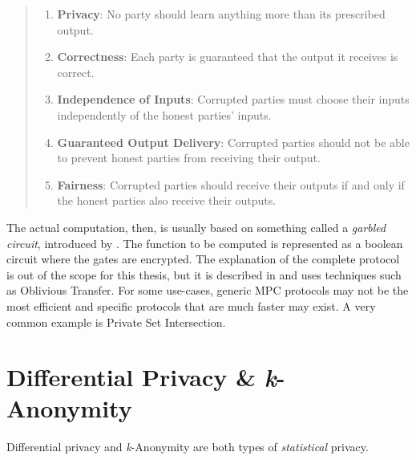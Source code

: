 \begin{quote}{\citet[p.2]{secure-mpc}}
\begin{enumerate}
    \item \textbf{Privacy}: No party should learn anything more than its prescribed output.
    \item \textbf{Correctness}: Each party is guaranteed that the output it receives is correct.
    \item \textbf{Independence of Inputs}: Corrupted parties must choose their inputs independently of the honest parties' inputs.
    \item \textbf{Guaranteed Output Delivery}: Corrupted parties should not be able to prevent honest parties from receiving their output.
    \item \textbf{Fairness}: Corrupted parties should receive their outputs if and only if the honest parties also receive their outputs.
\end{enumerate}
\end{quote}
The actual computation, then, is usually based on something called a \textit{garbled circuit}, introduced by \citeauthor{yao}. The function to be computed is represented as a boolean circuit where the gates are encrypted. The explanation of the complete protocol is out of the scope for this thesis, but it is described in \citet{secure-mpc, pragmatic-mpc} and uses techniques such as Oblivious Transfer. For some use-cases, generic \gls{MPC} protocols may not be the most efficient and specific protocols that are much faster may exist. A very common example is Private Set Intersection.


\section{Differential Privacy \& \textit{k}-Anonymity}
Differential privacy and \textit{k}-Anonymity are both types of \textit{statistical} privacy. 

